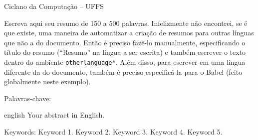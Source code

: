 \documentclass[serif, english, brazilian]{uffstex}
\begin{document}

\pretextual%

\imprimircapa%

\imprimirfolhaderosto*%


                         {Ciclano da Computação -- UFFS}

\begin{resumo}
  Escreva aqui seu resumo de 150 a 500 palavras.
  Infelizmente não encontrei, se é que existe, uma maneira de automatizar
  a criação de resumos para outras línguas que não a do documento.
  Então é preciso fazê-lo manualmente, especificando o título do resumo
  (\enquote{Resumo} na língua a ser escrita) e também escrever o texto dentro
  do ambiente \texttt{otherlanguage*}. Além disso, para escrever em uma língua
  diferente da do documento, também é preciso especificá-la para o Babel
  (feito globalmente neste exemplo).

  \vspace{\baselineskip}

  Palavras-chave: \imprimirpcs
\end{resumo}

\begin{resumo}[Abstract]
  \begin{otherlanguage*}{english}
    Your abstract in English.

    \vspace{\baselineskip}

    Keywords: Keyword 1. Keyword 2. Keyword 3. Keyword 4. Keyword 5.
  \end{otherlanguage*}
\end{resumo}

\listoffigures*
\cleardoublepage%

\pdfbookmark{\listalgoritmoname}{\algoritmoext}
\listofalgoritmos*
\cleardoublepage%
\end{document}
